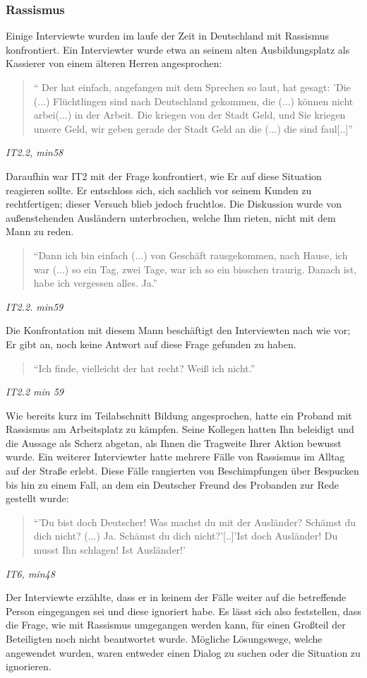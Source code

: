 \subsubsection{Rassismus}

Einige Interviewte wurden im laufe der Zeit in Deutschland mit Rassismus konfrontiert. Ein Interviewter wurde etwa an seinem alten Ausbildungsplatz als Kassierer von einem älteren Herren angesprochen:
\begin{quote}
    `` Der hat einfach, angefangen mit dem Sprechen so laut, hat gesagt: 'Die (...) Flüchtlingen sind nach Deutschland gekommen, die (...) können nicht arbei(...) in der Arbeit. Die kriegen von der Stadt Geld, und Sie kriegen unsere Geld, wir geben gerade der Stadt Geld an die (...) die sind faul[..]'' 
\end{quote}
\centerline{\textit{IT2.2, min58}}
Daraufhin war IT2 mit der Frage konfrontiert, wie Er auf diese Situation reagieren sollte. Er entschloss sich, sich sachlich vor seinem Kunden zu rechtfertigen; dieser Versuch blieb jedoch fruchtlos. Die Diskussion wurde von außenstehenden Ausländern unterbrochen, welche Ihm rieten, nicht mit dem Mann zu reden.
\begin{quote}
    ``Dann ich bin einfach (...) von Geschäft rausgekommen, nach Hause, ich war (...) so ein Tag, zwei Tage, war ich so ein bisschen traurig. Danach ist, habe ich vergessen alles. Ja.''
\end{quote}
\centerline{\textit{IT2.2. min59}}
Die Konfrontation mit diesem Mann beschäftigt den Interviewten nach wie vor; Er gibt an, noch keine Antwort auf diese Frage gefunden zu haben.
\begin{quote}
    ``Ich finde, vielleicht der hat recht? Weiß ich nicht.''
\end{quote}
\centerline{\textit{IT2.2 min 59}}
Wie bereits kurz im Teilabschnitt Bildung angesprochen, hatte ein Proband mit Rassismus am Arbeitsplatz zu kämpfen. Seine Kollegen hatten Ihn beleidigt und die Aussage als Scherz abgetan, als Ihnen die Tragweite Ihrer Aktion bewusst wurde.\newline
Ein weiterer Interviewter hatte mehrere Fälle von Rassismus im Alltag auf der Straße erlebt. Diese Fälle rangierten von Beschimpfungen über Bespucken bis hin zu einem Fall, an dem ein Deutscher Freund des Probanden zur Rede gestellt wurde:
\begin{quote}
    ``'Du bist doch Deutscher! Was machst du mit der Ausländer? Schämst du dich nicht? (...) Ja. Schämst du dich nicht?'[..]'Ist doch Ausländer! Du musst Ihn schlagen! Ist Ausländer!'
\end{quote}
\centerline{\textit{IT6, min48}}
Der Interviewte erzählte, dass er in keinem der Fälle weiter auf die betreffende Person eingegangen sei und diese ignoriert habe.\newline
Es lässt sich also feststellen, dass die Frage, wie mit Rassismus umgegangen werden kann, für einen Großteil der Beteiligten noch nicht beantwortet wurde. Mögliche Lösungswege, welche angewendet wurden, waren entweder einen Dialog zu suchen oder die Situation zu ignorieren.

